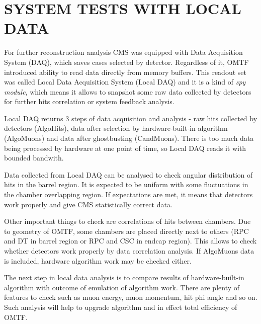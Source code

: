 \section{SYSTEM TESTS WITH LOCAL DATA}
For further reconstruction analysis CMS was equipped with Data Acquisition
System (DAQ), which saves cases selected by detector. Regardless of
it, OMTF introduced ability to read data directly from memory buffers.
This readout set was called Local Data Acquisition System (Local DAQ)
and it is a kind of \textit{spy module}, which means it allows to snapshot
some raw data collected by detectors for further hits correlation
or system feedback analysis.

Local DAQ returns 3 steps of data acquisition and analysis - raw hits
collected by detectors (AlgoHits), data after selection by hardware-built-in
algorithm (AlgoMuons) and data after ghostbusting (CandMuons). There
is too much data being processed by hardware at one point of time,
so Local DAQ reads it with bounded bandwith.

Data collected from Local DAQ can be analysed to check angular distribution
of hits in the barrel region. It is expected to be uniform with some
fluctuations in the chamber overlapping region. If expectations are
met, it means that detectors work properly and give CMS statistically
correct data.

Other important things to check are correlations of hits between chambers.
Due to geometry of OMTF, some chambers are placed directly next to
others (RPC and DT in barrel region or RPC and CSC in endcap region).
This allows to check whether detectors work properly by data correlation
analysis. If AlgoMuons data is included, hardware algorithm work may
be checked either.

The next step in local data analysis is to compare results of hardware-built-in
algorithm with outcome of emulation of algorithm work. There are plenty
of features to check such as muon energy, muon momentum, hit phi angle
and so on. Such analysis will help to upgrade algorithm and in effect
total efficiency of OMTF.
